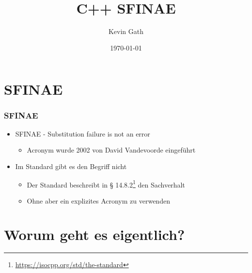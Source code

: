 \documentclass[hyperref={pdfpagelabels=false}]{beamer}
\title{C++ SFINAE}
\author{Kevin Gath}
\date{\today}
\begin{document}
\begin{frame}
\titlepage
\end{frame} 



\section{SFINAE} 
\begin{frame}
\frametitle{SFINAE} 
\begin{itemize}

\item SFINAE - \glqq{}Substitution failure is not an error\grqq
\begin{itemize}
\item Acronym wurde 2002 von David Vandevoorde eingeführt
\end{itemize}

\item Im Standard gibt es den Begriff nicht
\begin{itemize}
\item Der Standard beschreibt in § 14.8.2\footnote{\url{https://isocpp.org/std/the-standard}} den Sachverhalt
\item Ohne aber ein explizites Acronym zu verwenden
\end{itemize}

\end{itemize}

\end{frame}




\section{Worum geht es eigentlich?} 
\end{document}
